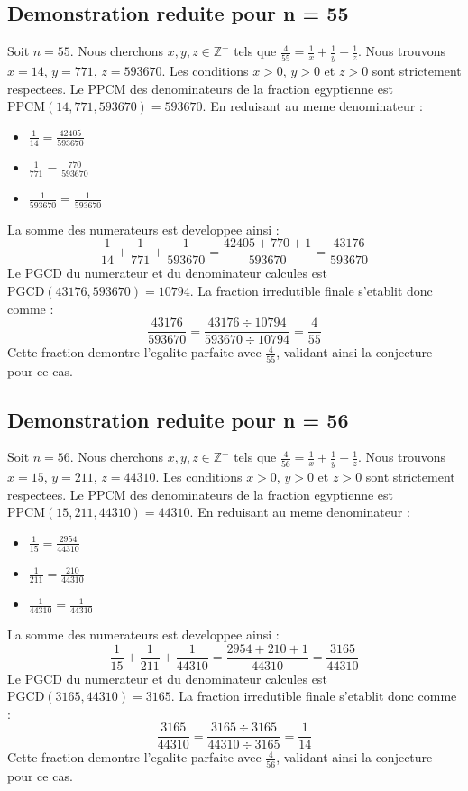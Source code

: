 \documentclass[11pt,a4paper]{article}
\begin{document}
\subsection{Demonstration reduite pour n = 55}
Soit $n = 55$. Nous cherchons $x, y, z \in \mathbb{Z}^{+}$ tels que $\frac{4}{55} = \frac{1}{x} + \frac{1}{y} + \frac{1}{z}$.
Nous trouvons $x = 14$, $y = 771$, $z = 593670$.
Les conditions $x > 0$, $y > 0$ et $z > 0$ sont strictement respectees.
Le PPCM des denominateurs de la fraction egyptienne est $\text{PPCM}(14, 771, 593670) = 593670$.
En reduisant au meme denominateur :
\begin{itemize}
    \item $\frac{1}{14} = \frac{42405}{593670}$
    \item $\frac{1}{771} = \frac{770}{593670}$
    \item $\frac{1}{593670} = \frac{1}{593670}$
\end{itemize}
La somme des numerateurs est developpee ainsi :
$$ \frac{1}{14} + \frac{1}{771} + \frac{1}{593670} = \frac{42405 + 770 + 1}{593670} = \frac{43176}{593670} $$
Le PGCD du numerateur et du denominateur calcules est $\text{PGCD}(43176, 593670) = 10794$.
La fraction irredutible finale s'etablit donc comme :
$$ \frac{43176}{593670} = \frac{43176 \div 10794}{593670 \div 10794} = \frac{4}{55} $$
Cette fraction demontre l'egalite parfaite avec $\frac{4}{55}$, validant ainsi la conjecture pour ce cas.

\subsection{Demonstration reduite pour n = 56}
Soit $n = 56$. Nous cherchons $x, y, z \in \mathbb{Z}^{+}$ tels que $\frac{4}{56} = \frac{1}{x} + \frac{1}{y} + \frac{1}{z}$.
Nous trouvons $x = 15$, $y = 211$, $z = 44310$.
Les conditions $x > 0$, $y > 0$ et $z > 0$ sont strictement respectees.
Le PPCM des denominateurs de la fraction egyptienne est $\text{PPCM}(15, 211, 44310) = 44310$.
En reduisant au meme denominateur :
\begin{itemize}
    \item $\frac{1}{15} = \frac{2954}{44310}$
    \item $\frac{1}{211} = \frac{210}{44310}$
    \item $\frac{1}{44310} = \frac{1}{44310}$
\end{itemize}
La somme des numerateurs est developpee ainsi :
$$ \frac{1}{15} + \frac{1}{211} + \frac{1}{44310} = \frac{2954 + 210 + 1}{44310} = \frac{3165}{44310} $$
Le PGCD du numerateur et du denominateur calcules est $\text{PGCD}(3165, 44310) = 3165$.
La fraction irredutible finale s'etablit donc comme :
$$ \frac{3165}{44310} = \frac{3165 \div 3165}{44310 \div 3165} = \frac{1}{14} $$
Cette fraction demontre l'egalite parfaite avec $\frac{4}{56}$, validant ainsi la conjecture pour ce cas.
\end{document}
